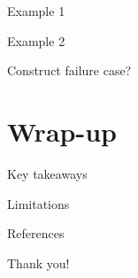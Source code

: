 \documentclass[usenames,dvipsnames]{beamer}
\theoremstyle{definition}
\begin{document}
\begin{frame}{Example 1}
    
\end{frame}

\begin{frame}{Example 2}
    
\end{frame}

\begin{frame}{Construct failure case?}
    
\end{frame}

\section{Wrap-up}
\begin{frame}{Key takeaways}
    
\end{frame}

\begin{frame}{Limitations}
    
\end{frame}

\begin{frame}{References}


%

    
\end{frame}


\begin{frame}{}
\begin{center}
    \Large{Thank you!}
\end{center}
    
\end{frame}
\end{document}

